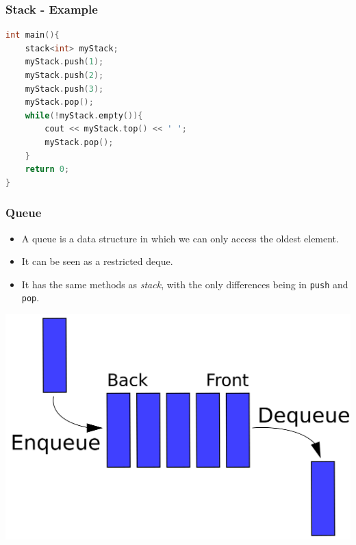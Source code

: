\documentclass{beamer}
\begin{document}
\begin{frame}[fragile]
    \frametitle{Stack - Example}

    \begin{lstlisting}[language=C++]
int main(){
    stack<int> myStack;
    myStack.push(1);
    myStack.push(2);
    myStack.push(3);
	myStack.pop();
	while(!myStack.empty()){
        cout << myStack.top() << ' ';
        myStack.pop();
    }
    return 0;
}
    \end{lstlisting}

    \begin{tcolorbox}[title=Output,fontupper=\scriptsize,fonttitle=\scriptsize]
    \end{tcolorbox}
\end{frame}

\begin{frame}
    \frametitle{Queue}

    \begin{itemize}
        \item A queue is a data structure in which we can only access the oldest element.
        \item It can be seen as a restricted deque.
        \item It has the same methods as \textit{stack}, with the only differences being in \texttt{push} and \texttt{pop}.
    \end{itemize}

    \begin{center}
        \includegraphics[scale=0.1]{images/queue}
    \end{center}
\end{frame}
\end{document}
